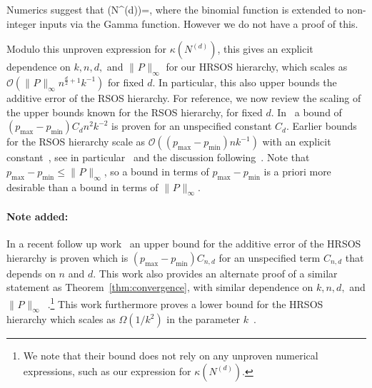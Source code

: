 \documentclass[11pt]{article}
\numberwithin{theorem}{section}
\theoremstyle{definition}
\newcommand{\tinyspace}{\mspace{1mu}}
\newcommand{\floor}[1]{\lfloor #1 \rfloor}
\newcommand{\norm}[1]{\lVert\tinyspace #1 \tinyspace\rVert}
\def\ba#1\ea{\begin{align}#1\end{align}}
\begin{document}
Numerics suggest that
\ba
\kappa(N^{(d)})=\binom{n/2+d-1}{\floor{d/2}},
\ea
where the binomial function is extended to non-integer inputs via the Gamma function. However we do not have a proof of this.

Modulo this unproven expression for $\kappa(N^{(d)})$, this gives an explicit dependence on $k,n,d,$ and $\norm{P}_{\infty}$ for our HRSOS hierarchy, which scales as $\mathcal{O}( \norm{P}_{\infty} n^{\frac{d}{2}+1}k^{-1})$ for fixed $d$. In particular, this also upper bounds the additive error of the RSOS hierarchy. For reference, we now review the scaling of the upper bounds known for the RSOS hierarchy, for fixed $d$. In~\cite[Theorem 1]{fang2021sum} a bound of ${ (p_{\max}-p_{\min}) C_d n^2 k^{-2}}$ is proven for an unspecified constant $C_d$. Earlier bounds for the RSOS hierarchy scale as ${\mathcal{O}((p_{\max}-p_{\min}) nk^{-1})}$ with an explicit constant~\cite{reznick1995uniform,faybusovich2004global,doherty2012convergence}, see in particular~\cite[Theorem 1]{faybusovich2004global} and the discussion following~\cite[Corollary 7.1]{doherty2012convergence}. Note that $p_{\max}-p_{\min} \leq \norm{P}_{\infty}$, so a bound in terms of $p_{\max}-p_{\min}$ is a priori more desirable than a bound in terms of $\norm{P}_{\infty}$.

\paragraph{{Note added:}} In a recent follow up work~\cite[Theorem 5.6]{blomenhofer2024moment} an upper bound for the additive error of the HRSOS hierarchy is proven which is $(p_{\max}-p_{\min})C_{n,d}$ for an unspecified term $C_{n,d}$ that depends on $n$ and $d$. This work also provides an alternate proof of a similar statement as Theorem~\ref{thm:convergence}, with similar dependence on $k,n,d,$ and $\norm{P}_{\infty}$~\cite[Theorem 5.4]{blomenhofer2024moment}.\footnote{We note that their bound does not rely on any unproven numerical expressions, such as our expression for $\kappa(N^{(d)})$.} This work furthermore proves a lower bound for the HRSOS hierarchy which scales as $\Omega(1/k^2)$ in the parameter $k$~\cite[Theorem 5.8]{blomenhofer2024moment}.



\end{document}
